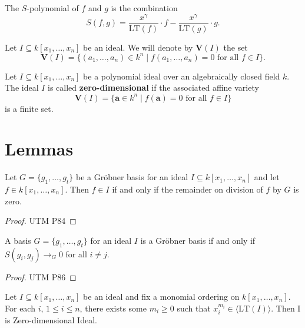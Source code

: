 \begin{definition}\label{S Polynomial}
  The $S$-polynomial of $f$ and $g$ is the combination
  \[
  S(f, g) = \frac{x^\gamma}{\mathrm{LT}(f)} \cdot f - \frac{x^\gamma}{\mathrm{LT}(g)} \cdot g.
  \]
\end{definition}

\begin{definition}\label{Variety}
  Let \( I \subseteq k[x_1, \ldots, x_n] \) be an ideal. We will denote by \( \mathbf{V}(I) \) the set
  \[
  \mathbf{V}(I) = \{(a_1, \ldots, a_n) \in k^n \mid f(a_1, \ldots, a_n) = 0 \text{ for all } f \in I\}.
  \]
\end{definition}

\begin{definition}
  Let \( I \subseteq k[x_1, \ldots, x_n] \) be a polynomial ideal over an algebraically closed field \( k \).
  The ideal \( I \) is called \textbf{zero-dimensional} if the associated affine variety
  \[
  \mathbf{V}(I) = \{\mathbf{a} \in k^n \mid f(\mathbf{a}) = 0 \text{ for all } f \in I\}
  \]
  is a finite set.
  \end{definition}

\chapter{Lemmas}
\begin{lemma}\label{groebner_membership}
  Let \( G = \{g_1, \dots, g_t\} \) be a Gröbner basis for an ideal \( I \subseteq k[x_1, \dots, x_n] \) and let \( f \in k[x_1, \dots, x_n] \). Then \( f \in I \) if and only if the remainder on division of \( f \) by \( G \) is zero.
\end{lemma}
\begin{proof}
  UTM P84
\end{proof}

\begin{lemma}\label{Buchberger Criteria}
A basis \( G = \{ g_1, \ldots, g_t \} \) for an ideal \( I \) is a Gröbner basis if and only if \( S(g_i, g_j) \to_G 0 \) for all \( i \neq j \).
\end{lemma}
\begin{proof}
 UTM P86
\end{proof}

\begin{lemma}\label{verify_zero_dim_ideal}
  Let \( I \subseteq k[x_1, \ldots, x_n] \) be an ideal and fix a monomial ordering on \( k[x_1, \ldots, x_n] \). For each \( i \), \( 1 \leq i \leq n \), there exists some \( m_i \geq 0 \) such that \( x_i^{m_i} \in \langle \mathrm{LT}(I)\rangle \). Then I is Zero-dimensional Ideal.
\end{lemma}


